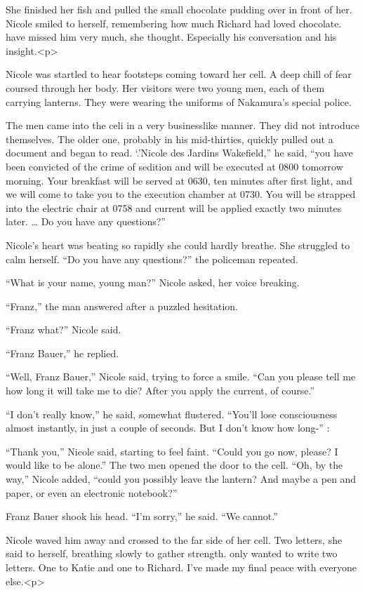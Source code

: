 \documentclass[]{article}
\begin{document}
{{She finished her fish and pulled the small chocolate pudding over in front of her. Nicole smiled to herself, remembering how much Richard had loved chocolate. have missed him very much, she thought. Especially his conversation and his insight.<p>

Nicole was startled to hear footsteps coming toward her cell. A deep chill of fear coursed through her body. Her visitors were two young men, each of them carrying lanterns. They were wearing the uniforms of Nakamura’s special police.

The men came into the celi in a very businesslike manner. They did not introduce themselves. The older one, probably in his mid-thirties, quickly pulled out a document and began to read. ‘.’Nicole des Jardins Wakefield,” he said, “you have been convicted of the crime of sedition and will be executed at 0800 tomorrow morning. Your breakfast will be served at 0630, ten minutes after first light, and we will come to take you to the execution chamber at 0730. You will be strapped into the electric chair at 0758 and current will be applied exactly two minutes later. … Do you have any questions?”

Nicole’s heart was beating so rapidly she could hardly breathe. She struggled to calm herself. “Do you have any questions?” the policeman repeated.

“What is your name, young man?” Nicole asked, her voice breaking.

“Franz,” the man answered after a puzzled hesitation.

“Franz what?” Nicole said.

“Franz Bauer,” he replied.

“Well, Franz Bauer,” Nicole said, trying to force a smile. “Can you please tell me how long it will take me to die? After you apply the current, of course.”

“I don’t really know,” he said, somewhat flustered. “You’ll lose consciousness almost instantly, in just a couple of seconds. But I don’t know how long-” :

“Thank you,” Nicole said, starting to feel faint. “Could you go now, please? I would like to be alone.” The two men opened the door to the cell. “Oh, by the way,” Nicole added, “could you possibly leave the lantern? And maybe a pen and paper, or even an electronic notebook?”

Franz Bauer shook his head. “I’m sorry,” he said. “We cannot.”

Nicole waved him away and crossed to the far side of her cell. Two letters, she said to herself, breathing slowly to gather strength. only wanted to write two letters. One to Katie and one to Richard. I’ve made my final peace with everyone else.<p>

}}
\end{document}
